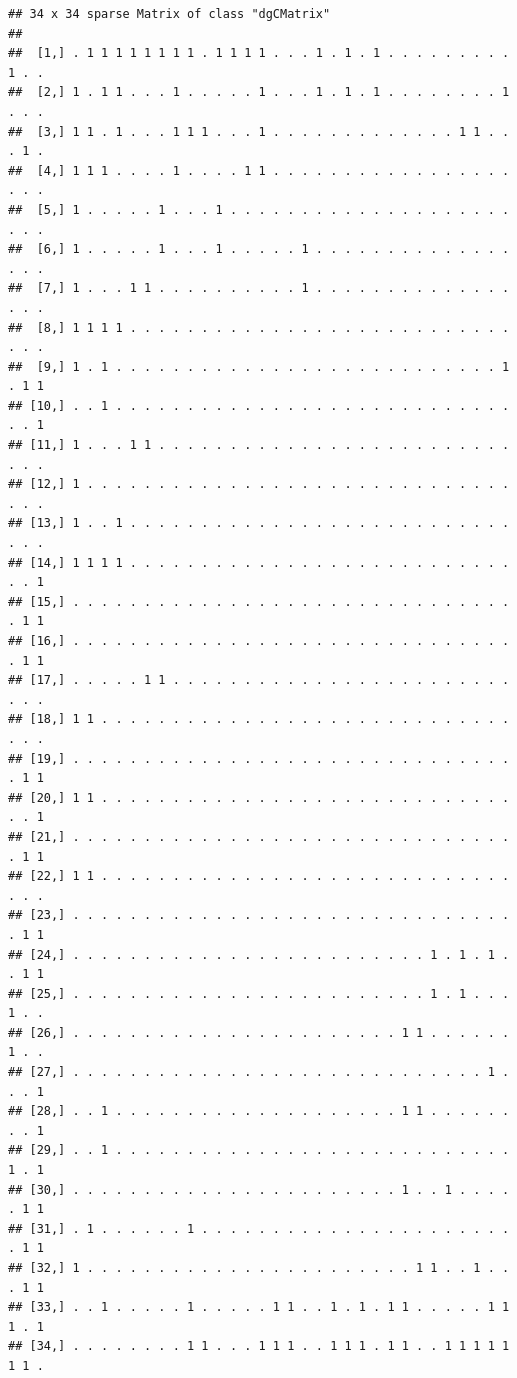 \documentclass[
]{article}
\begin{document}
\begin{verbatim}
## 34 x 34 sparse Matrix of class "dgCMatrix"
##                                                                          
##  [1,] . 1 1 1 1 1 1 1 1 . 1 1 1 1 . . . 1 . 1 . 1 . . . . . . . . . 1 . .
##  [2,] 1 . 1 1 . . . 1 . . . . . 1 . . . 1 . 1 . 1 . . . . . . . . 1 . . .
##  [3,] 1 1 . 1 . . . 1 1 1 . . . 1 . . . . . . . . . . . . . 1 1 . . . 1 .
##  [4,] 1 1 1 . . . . 1 . . . . 1 1 . . . . . . . . . . . . . . . . . . . .
##  [5,] 1 . . . . . 1 . . . 1 . . . . . . . . . . . . . . . . . . . . . . .
##  [6,] 1 . . . . . 1 . . . 1 . . . . . 1 . . . . . . . . . . . . . . . . .
##  [7,] 1 . . . 1 1 . . . . . . . . . . 1 . . . . . . . . . . . . . . . . .
##  [8,] 1 1 1 1 . . . . . . . . . . . . . . . . . . . . . . . . . . . . . .
##  [9,] 1 . 1 . . . . . . . . . . . . . . . . . . . . . . . . . . . 1 . 1 1
## [10,] . . 1 . . . . . . . . . . . . . . . . . . . . . . . . . . . . . . 1
## [11,] 1 . . . 1 1 . . . . . . . . . . . . . . . . . . . . . . . . . . . .
## [12,] 1 . . . . . . . . . . . . . . . . . . . . . . . . . . . . . . . . .
## [13,] 1 . . 1 . . . . . . . . . . . . . . . . . . . . . . . . . . . . . .
## [14,] 1 1 1 1 . . . . . . . . . . . . . . . . . . . . . . . . . . . . . 1
## [15,] . . . . . . . . . . . . . . . . . . . . . . . . . . . . . . . . 1 1
## [16,] . . . . . . . . . . . . . . . . . . . . . . . . . . . . . . . . 1 1
## [17,] . . . . . 1 1 . . . . . . . . . . . . . . . . . . . . . . . . . . .
## [18,] 1 1 . . . . . . . . . . . . . . . . . . . . . . . . . . . . . . . .
## [19,] . . . . . . . . . . . . . . . . . . . . . . . . . . . . . . . . 1 1
## [20,] 1 1 . . . . . . . . . . . . . . . . . . . . . . . . . . . . . . . 1
## [21,] . . . . . . . . . . . . . . . . . . . . . . . . . . . . . . . . 1 1
## [22,] 1 1 . . . . . . . . . . . . . . . . . . . . . . . . . . . . . . . .
## [23,] . . . . . . . . . . . . . . . . . . . . . . . . . . . . . . . . 1 1
## [24,] . . . . . . . . . . . . . . . . . . . . . . . . . 1 . 1 . 1 . . 1 1
## [25,] . . . . . . . . . . . . . . . . . . . . . . . . . 1 . 1 . . . 1 . .
## [26,] . . . . . . . . . . . . . . . . . . . . . . . 1 1 . . . . . . 1 . .
## [27,] . . . . . . . . . . . . . . . . . . . . . . . . . . . . . 1 . . . 1
## [28,] . . 1 . . . . . . . . . . . . . . . . . . . . 1 1 . . . . . . . . 1
## [29,] . . 1 . . . . . . . . . . . . . . . . . . . . . . . . . . . . 1 . 1
## [30,] . . . . . . . . . . . . . . . . . . . . . . . 1 . . 1 . . . . . 1 1
## [31,] . 1 . . . . . . 1 . . . . . . . . . . . . . . . . . . . . . . . 1 1
## [32,] 1 . . . . . . . . . . . . . . . . . . . . . . . 1 1 . . 1 . . . 1 1
## [33,] . . 1 . . . . . 1 . . . . . 1 1 . . 1 . 1 . 1 1 . . . . . 1 1 1 . 1
## [34,] . . . . . . . . 1 1 . . . 1 1 1 . . 1 1 1 . 1 1 . . 1 1 1 1 1 1 1 .
\end{verbatim}
\end{document}
